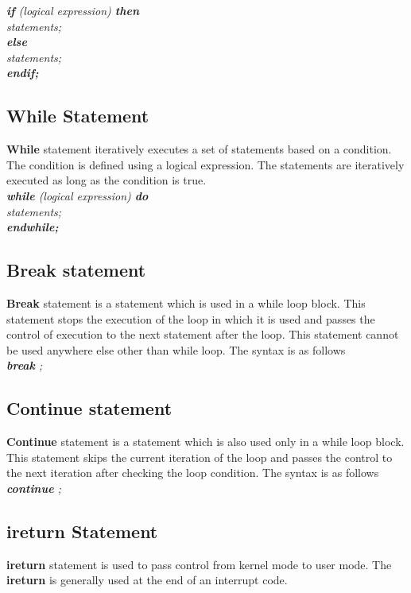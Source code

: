 \documentclass[11pt]{article}
\begin{document}
\textit{
\textbf{if} (logical expression) \textbf{then}  \\
 \indent \indent statements; \\
\indent \textbf{else} \\
\indent  \indent statements; \\
\indent \textbf{endif;}  \\
}



\subsection{While Statement}
\textbf{While} statement iteratively executes a set of statements based on a condition. The condition is defined using a logical expression.  The statements are iteratively executed as long as the condition is true.\\

\textit{
\textbf{while} (logical expression) \textbf{do}  \\
 \indent \indent statements; \\
\indent \textbf{endwhile;}  \\
}


\subsection{Break statement}
\textbf{Break} statement is a statement which is used in a while loop block. This statement stops the execution of the loop in which it is used and passes the control of execution to the next statement after the loop. This statement cannot be used anywhere else other than while loop. The syntax is as follows\\

\textit{\textbf{break} ;}


\subsection{Continue statement}
\textbf{Continue} statement is a statement which is also used only in a while loop block. This statement skips the current iteration of the loop and passes the control to the next iteration after checking the loop condition. The syntax is as follows\\

\textit{\textbf{continue} ;}

\subsection{ireturn Statement}
\textbf{ireturn} statement is used to pass control from kernel mode to user mode. The \textbf{ireturn} is generally used at the end of an interrupt code.
\end{document}
